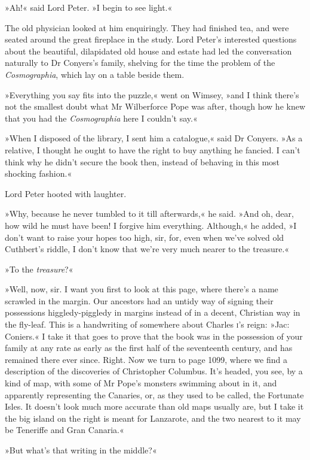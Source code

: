 »Ah!« said Lord Peter. »I begin to see light.«

The old physician looked at him enquiringly. They had finished tea, and were seated around the great fireplace in the study. Lord Peter's interested questions about the beautiful, dilapidated old house and estate had led the conversation naturally to Dr Conyers's family, shelving for the time the problem of the \textit{Cosmographia}, which lay on a table beside them.

»Everything you say fits into the puzzle,« went on Wimsey, »and I think there's not the smallest doubt what Mr Wilberforce Pope was after, though how he knew that you had the \textit{Cosmographia} here I couldn't say.«

»When I disposed of the library, I sent him a catalogue,« said Dr Conyers. »As a relative, I thought he ought to have the right to buy anything he fancied. I can't think why he didn't secure the book then, instead of behaving in this most shocking fashion.«

Lord Peter hooted with laughter.

»Why, because he never tumbled to it till afterwards,« he said. »And oh, dear, how wild he must have been! I forgive him everything. Although,« he added, »I don't want to raise your hopes too high, sir, for, even when we've solved old Cuthbert's riddle, I don't know that we're very much nearer to the treasure.«

»To the \textit{treasure}?«

»Well, now, sir. I want you first to look at this page, where there's a name scrawled in the margin. Our ancestors had an untidy way of signing their possessions higgledy-piggledy in margins instead of in a decent, Christian way in the fly-leaf. This is a handwriting of somewhere about Charles \textsc{i}'s reign: »Jac: Coniers.« I take it that goes to prove that the book was in the possession of your family at any rate as early as the first half of the seventeenth century, and has remained there ever since. Right. Now we turn to page 1099, where we find a description of the discoveries of Christopher Columbus. It's headed, you see, by a kind of map, with some of Mr Pope's monsters swimming about in it, and apparently representing the Canaries, or, as they used to be called, the Fortunate Isles. It doesn't look much more accurate than old maps usually are, but I take it the big island on the right is meant for Lanzarote, and the two nearest to it may be Teneriffe and Gran Canaria.«

»But what's that writing in the middle?«

